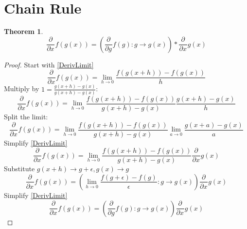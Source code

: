 \documentclass[]{article}
\newcommand{\pqty}[1]{{\left(#1\right)}}
\newcommand{\pdiff}[2]{\frac{\partial^{#2}}{\partial #1^{#2}}}
\newtheorem{theorem}{Theorem}[section]
\numberwithin{equation}{section}
\begin{document}
	\section{Chain Rule}
	\begin{theorem}
		\begin{equation}
		\label{DiffChainRule}
		\pdiff{x}{}{f\pqty{g\pqty{x}}}
		=\pqty{\pdiff{g}{}f\pqty{g}:g\to g\pqty{x}}*\pdiff{x}{}{g\pqty{x}}
		\end{equation}
	\end{theorem}
	\begin{proof}
		Start with \eqref{DerivLimit}
		\begin{equation}
		\pdiff{x}{}{f\pqty{g\pqty{x}}}
		=\lim\limits_{h\to 0}
		\frac{f\pqty{g\pqty{x+h}}-f\pqty{g\pqty{x}}}{h}
		\end{equation}
		Multiply by \(1=\frac{g\pqty{x+h}-g\pqty{x}}{g\pqty{x+h}-g\pqty{x}}\):
		\begin{equation}
		\pdiff{x}{}{f\pqty{g\pqty{x}}}
		=\lim\limits_{h\to 0}
		\frac{f\pqty{g\pqty{x+h}}-f\pqty{g\pqty{x}}}{g\pqty{x+h}-g\pqty{x}}
		\frac{g\pqty{x+h}-g\pqty{x}}{h}
		\end{equation}
		Split the limit:
		\begin{equation}
		\pdiff{x}{}{f\pqty{g\pqty{x}}}
		=\lim\limits_{h\to 0}
		\frac{f\pqty{g\pqty{x+h}}-f\pqty{g\pqty{x}}}{g\pqty{x+h}-g\pqty{x}}
		\lim\limits_{a\to 0}
		\frac{g\pqty{x+a}-g\pqty{x}}{a}
		\end{equation}
		Simplify \eqref{DerivLimit}
		\begin{equation}
		\pdiff{x}{}{f\pqty{g\pqty{x}}}
		=\lim\limits_{h\to 0}
		\frac{f\pqty{g\pqty{x+h}}-f\pqty{g\pqty{x}}}{g\pqty{x+h}-g\pqty{x}}
		\pdiff{x}{}{g\pqty{x}}
		\end{equation}
		Substitute \(g\pqty{x+h}\to g+\epsilon,g\pqty{x}\to g\)
		\begin{equation}
		\pdiff{x}{}{f\pqty{g\pqty{x}}}
		=\pqty{\lim\limits_{h\to 0}
		\frac{f\pqty{g+\epsilon}-f\pqty{g}}{\epsilon}:g\to g\pqty{x}}
		\pdiff{x}{}{g\pqty{x}}
		\end{equation}
		Simplify \eqref{DerivLimit}
		\begin{equation}
		\pdiff{x}{}{f\pqty{g\pqty{x}}}
		=\pqty{\pdiff{g}{}f\pqty{g}:g\to g\pqty{x}}
		\pdiff{x}{}{g\pqty{x}}
		\end{equation}
	\end{proof}
	
\end{document}

